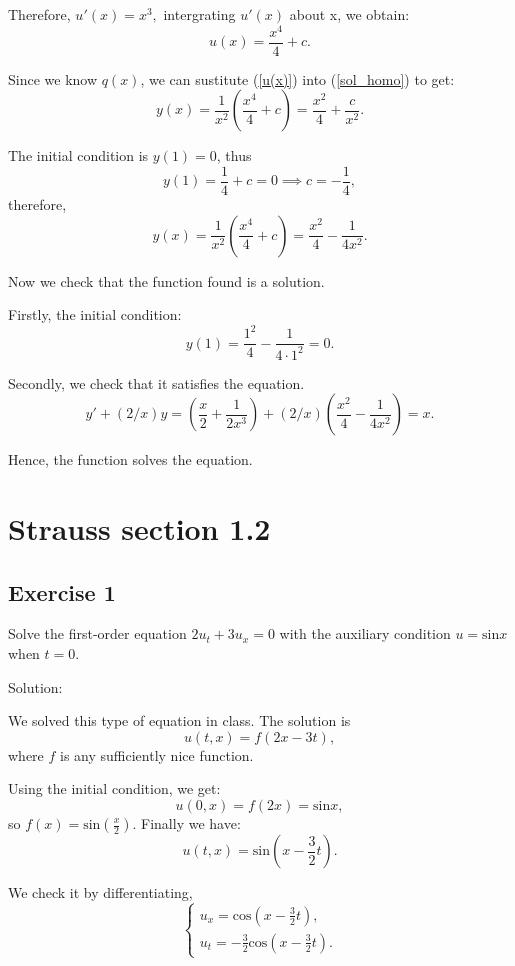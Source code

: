 \documentclass{article}
\renewcommand{\thesubsection}{\thesection.\alph{subsection}} %
\begin{document}
	   Therefore, $u'(x) = x^3, $ intergrating $u'(x)$ about x, we obtain:
        \begin{equation}\label{u(x)}
        	u(x) = \frac{x^4}{4} + c .
        \end{equation} 
		
		Since we know $q(x)$, we can sustitute (\ref{u(x)}) into (\ref{sol_homo}) to get:
		\[y(x) = \frac{1}{x^2}\left(\frac{x^4}{4}+c\right) = \frac{x^2}{4} + \frac{c}{x^2}.\]

		The initial condition is $y(1)=0$, thus \[ y(1)=\frac{1}{4} + c= 0 \implies c=-\frac{1}{4},\]
		therefore,
		\[y(x) = \frac{1}{x^2}\left(\frac{x^4}{4}+c\right) = \frac{x^2}{4} - \frac{1}{4x^2}.\]
		
		Now we check that the function found is a solution.

		Firstly, the initial condition:
		\[y(1)= \frac{1^2}{4} - \frac{1}{4\cdot 1^2} =0.\]

		Secondly, we check that it satisfies the equation.
		\[y'+(2/x)y = \left(\frac{x}{2} + \frac{1}{2x^3}\right) +(2/x)\left(\frac{x^2}{4} - \frac{1}{4x^2}\right) = x.\]
		
		Hence, the function solves the equation.

\section{Strauss section 1.2}
\subsection{Exercise 1}
			Solve the first-order equation
			$2u_t +3u_ x =0$ with the auxiliary condition $u=\text{sin}x$ when $t=0.$

			Solution:

			We solved this type of equation in class.
			The solution is 
			\[ u(t,x)=f(2x-3t),\]
			where $f$ is any sufficiently nice function.

			Using the initial condition, we get:
			\[u(0,x)=f(2x)=\text{sin}x,\]
			so $f(x)=\text{sin}\left(\frac{x}{2}\right)$.
			Finally we have:
			\[u(t,x)=\text{sin}\left(x-\frac{3}{2}t\right).\]
			
			We check it by differentiating,
			\begin{equation*}
				\begin{cases}
					u_x=\text{cos}\left(x-\frac{3}{2}t\right),
					\\
					u_t=-\frac{3}{2}\text{cos}\left(x-\frac{3}{2}t\right).
				\end{cases}
			\end{equation*}
\end{document}
